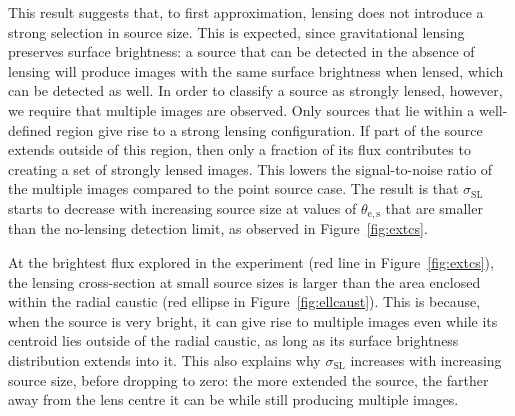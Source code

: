 \documentclass{aa}
\def\crosssect{\sigma_\mathrm{{SL}}}
\def\Fref#1{Figure~\ref{#1}\xspace}
\begin{document}
This result suggests that, to first approximation, lensing does not introduce a strong selection in source size.
This is expected, since gravitational lensing preserves surface brightness: a source that can be detected in the absence of lensing will produce images with the same surface brightness when lensed, which can be detected as well.
In order to classify a source as strongly lensed, however, we require that multiple images are observed. 
Only sources that lie within a well-defined region give rise to a strong lensing configuration.
If part of the source extends outside of this region, then only a fraction of its flux contributes to creating a set of strongly lensed images.
This lowers the signal-to-noise ratio of the multiple images compared to the point source case.
The result is that $\crosssect$ starts to decrease with increasing source size at values of $\theta_{\mathrm{e,s}}$ that are smaller than the no-lensing detection limit, as observed in \Fref{fig:extcs}.

At the brightest flux explored in the experiment (red line in \Fref{fig:extcs}), the lensing cross-section at small source sizes is larger than the area enclosed within the radial caustic (red ellipse in \Fref{fig:ellcaust}).
This is because, when the source is very bright, it can give rise to multiple images even while its centroid lies outside of the radial caustic, as long as its surface brightness distribution extends into it.
This also explains why $\crosssect$ increases with increasing source size, before dropping to zero: the more extended the source, the farther away from the lens centre it can be while still producing multiple images.

\end{document}
